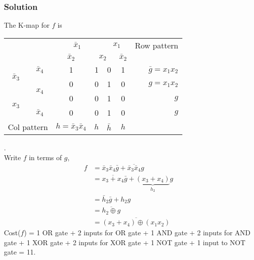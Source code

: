\documentclass[twocolumn]{article}
\newcommand{\bx}{\bar{x}}
\begin{document}
\subsubsection*{Solution}
The K-map for $f$ is
\\[1em]
\begin{tabular}{cc|cccc|r}
  \toprule
  && \multicolumn{2}{c|}{$\bx_1$} & \multicolumn{2}{c|}{$x_1$} & Row pattern
  \\
  && $\bx_2$ & \multicolumn{2}{|c|}{$x_2$} & $\bx_2$
  \\ \midrule
  \multirow{2}{*}{$\bx_3$} & $\bx_4$
                                  & 1 & 1 & 0 & 1 & $\bar{g} = x_1 x_2$
  \\\cmidrule{2-2}
  & \multirow{2}{*}{$x_4$}
                                  & 0 & 0 & 1 & 0 & $g = x_1x_2$
  \\\cmidrule{1-1}
  \multirow{2}{*}{$x_3$}   &
                                  & 0 & 0 & 1 & 0 & $g$
  \\\cmidrule{2-2}
  & $\bx_4$
                                  & 0 & 0 & 1 & 0 & $g$
  \\\midrule
  \multicolumn{2}{l|}{Col pattern} & $h = \bx_3\bx_4$ & $h$ &  $\bar{h}$ & $h$ & 
  \\\bottomrule
\end{tabular}.
\\[1em]

Write $f$ in terms of $g$,
\begin{align}
  f &= \bx_3\bx_4 \bar{g} +  \overline{\bx_3\bx_4} g
  \\
  &= \overline{x_3 + x_4} \bar{g} + \underbrace{(x_3 + x_4)}_{h_2} g
  \\
  &= \bar{h}_2 \bar{g} + h_2 g
    \\
  &= \overline{h_2 \oplus g}
    \\
  &= \overline{(x_3 + x_4) \oplus (x_1 x_2)}
\end{align}
Cost($f$) = 1 OR gate + 2 inputs for OR gate + 1 AND gate + 2 inputs for AND
gate + 1 XOR gate + 2 inputs for XOR gate + 1 NOT gate + 1 input to NOT gate = 11.
\end{document}
